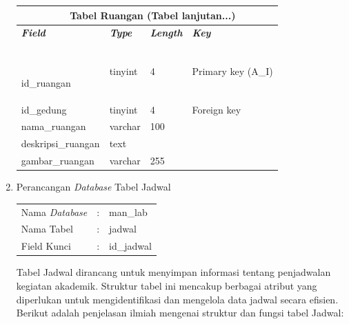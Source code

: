 \begin{enumerate}
{\begin{longtable}{l l l l}
				      \multicolumn{4}{c}{\tablename\ \thetable\ {Tabel Ruangan} \space (Tabel lanjutan...)}               \\
				      \hline
				      \textbf{\textit{Field}} & \textbf{\textit{Type}} & \textbf{\textit{Length}} & \textbf{\textit{Key}} \\
				      \
				      \endhead

				      id\_ruangan             & tinyint                & 4                        & Primary key (A\_I)    \\
				      id\_gedung              & tinyint                & 4                        & Foreign key           \\
				      nama\_ruangan           & varchar                & 100                      &                       \\
				      deskripsi\_ruangan      & text                   &                          &                       \\
				      gambar\_ruangan         & varchar                & 255                      &                       \\
				      \hline
			      \end{longtable}
		      }

	\item Perancangan \textit{Database} Tabel Jadwal \\
	      \begin{tabular}{lll}
		      Nama \textit{Database} & : & man\_lab   \\
		      Nama Tabel             & : & jadwal     \\
		      Field Kunci            & : & id\_jadwal \\
	      \end{tabular}

	      Tabel Jadwal dirancang untuk menyimpan informasi tentang penjadwalan kegiatan akademik. Struktur tabel ini mencakup berbagai atribut yang diperlukan untuk mengidentifikasi dan mengelola data jadwal secara efisien. Berikut adalah penjelasan ilmiah mengenai struktur dan fungsi tabel Jadwal:


\end{enumerate}
